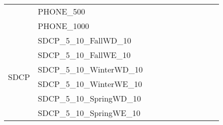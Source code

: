 \begin{table}[]
{\begin{tabular}{|c|l|lll|lll|l|l|l|}
			& PHONE\_500                    &                                   &                                 &             &                           &                         &      &                                         &                                 &                                \\
			& PHONE\_1000                   &                                   &                                 &             &                           &                         &      &                                         &                                 &                                \\ \hline
			\multirow{8}{*}{SDCP}    & SDCP\_5\_10\_FallWD\_10       &                                   &                                 &             &                           &                         &      &                                         &                                 &                                \\
			& SDCP\_5\_10\_FallWE\_10       &                                   &                                 &             &                           &                         &      &                                         &                                 &                                \\
			& SDCP\_5\_10\_WinterWD\_10     &                                   &                                 &             &                           &                         &      &                                         &                                 &                                \\
			& SDCP\_5\_10\_WinterWE\_10     &                                   &                                 &             &                           &                         &      &                                         &                                 &                                \\
			& SDCP\_5\_10\_SpringWD\_10     &                                   &                                 &             &                           &                         &      &                                         &                                 &                                \\
			& SDCP\_5\_10\_SpringWE\_10     &                                   &                                 &             &                           &                         &      &                                         &                                 &                                \\

\end{tabular}}
\end{table}
